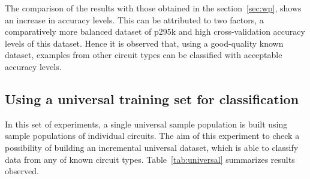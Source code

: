 The comparison of the results with those obtained in the section~\ref{sec:wp}, shows an increase in accuracy levels. This can be attributed to two factors, a comparatively more balanced dataset of p295k and high cross-validation accuracy levels of this dataset. Hence it is observed that, using a good-quality known dataset, examples from other circuit types can be classified with acceptable accuracy levels.

\subsection{Using a universal training set for classification}

In this set of experiments, a single universal sample population is built using sample populations of individual circuits. The aim of this experiment to check a possibility of building an incremental universal dataset, which is able to classify data from any of known circuit types. Table~\ref{tab:universal} summarizes results observed.

